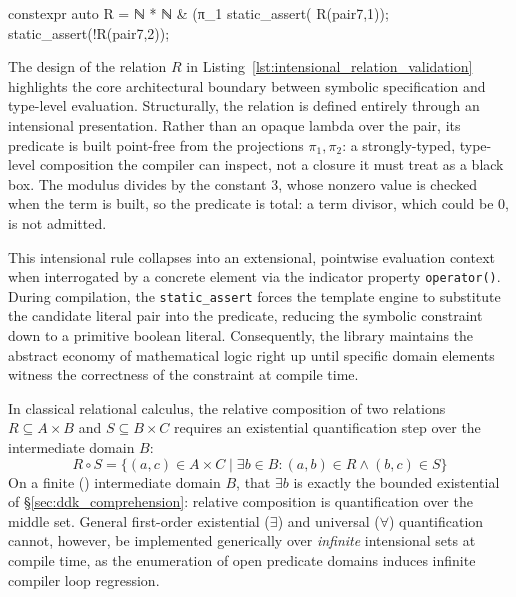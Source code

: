 \documentclass[11pt, a4paper]{article}
\begin{document}
\begin{listing}[htbp]
\caption{The residue relation $\{(a,b) \in \mathbb{N}\times\mathbb{N} \mid b = a \bmod 3\}$ as a strongly-typed point-free predicate, and its pointwise validation.  The divisor is a constant, so the predicate is total.}
\label{lst:intensional_relation_validation}
\begin{cpp}
constexpr auto R = ℕ * ℕ & (π_1 %
static_assert( R(pair{7,1}));
static_assert(!R(pair{7,2}));
\end{cpp}
\end{listing}

The design of the relation $R$ in Listing~\ref{lst:intensional_relation_validation} highlights the core architectural boundary between symbolic specification and type-level evaluation.
Structurally, the relation is defined entirely through an intensional presentation.
Rather than an opaque lambda over the pair, its predicate is built point-free from the projections $\pi_1, \pi_2$: a strongly-typed, type-level composition the compiler can inspect, not a closure it must treat as a black box.
The modulus divides by the constant $3$, whose nonzero value is checked when the term is built, so the predicate is total: a term divisor, which could be $0$, is not admitted.

This intensional rule collapses into an extensional, pointwise evaluation context when interrogated by a concrete element via the indicator property \texttt{operator()}.
During compilation, the \texttt{static\_assert} forces the template engine to substitute the candidate literal pair into the predicate, reducing the symbolic constraint down to a primitive boolean literal.
Consequently, the library maintains the abstract economy of mathematical logic right up until specific domain elements witness the correctness of the constraint at compile time.

In classical relational calculus, the relative composition of two relations $R \subseteq A \times B$ and $S \subseteq B \times C$ requires an existential quantification step over the intermediate domain $B$:
\begin{equation}
R \circ S = \{ (a, c) \in A \times C \mid \exists b \in B : (a, b) \in R \land (b, c) \in S \}
\end{equation}
On a finite () intermediate domain $B$, that $\exists b$ is exactly the bounded existential of §\ref{sec:ddk_comprehension}: relative composition is quantification over the middle set.
General first-order existential ($\exists$) and universal ($\forall$) quantification cannot, however, be implemented generically over \emph{infinite} intensional sets at compile time, as the enumeration of open predicate domains induces infinite compiler loop regression.
\end{document}
